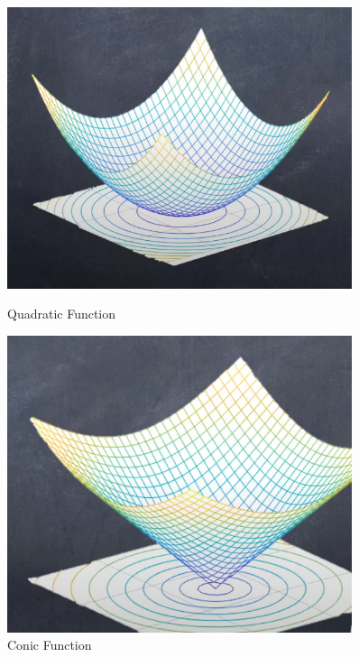\begin{figure}[h]
    \centering
    \begin{minipage}{0.45\textwidth}
        \centering
        \includegraphics[width=0.9\textwidth]{Figures/Quad.PNG} %
        \caption{Quadratic Function}
    \end{minipage}\hfill
    \begin{minipage}{0.45\textwidth}
        \centering
        \includegraphics[width=0.9\textwidth]{Figures/Linear.PNG} %
        \caption{Conic Function}
    \end{minipage}
\end{figure}

